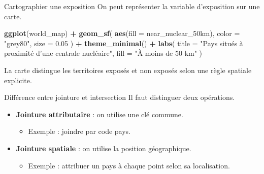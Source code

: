 \documentclass[
  10pt,
  ignorenonframetext,
]{beamer}
\newenvironment{Shaded}{\begin{snugshade}}{\end{snugshade}}
\newcommand{\AttributeTok}[1]{\textcolor[rgb]{0.13,0.29,0.53}{#1}}
\newcommand{\FloatTok}[1]{\textcolor[rgb]{0.00,0.00,0.81}{#1}}
\newcommand{\FunctionTok}[1]{\textcolor[rgb]{0.13,0.29,0.53}{\textbf{#1}}}
\newcommand{\NormalTok}[1]{#1}
\newcommand{\SpecialCharTok}[1]{\textcolor[rgb]{0.81,0.36,0.00}{\textbf{#1}}}
\newcommand{\StringTok}[1]{\textcolor[rgb]{0.31,0.60,0.02}{#1}}
\begin{document}
\begin{frame}[fragile]{Cartographier une exposition}
\label{cartographier-une-exposition}
On peut représenter la variable d'exposition sur une carte.

\begin{Shaded}
\begin{Highlighting}[]
\FunctionTok{ggplot}\NormalTok{(world\_map) }\SpecialCharTok{+}
  \FunctionTok{geom\_sf}\NormalTok{(}
    \FunctionTok{aes}\NormalTok{(}\AttributeTok{fill =}\NormalTok{ near\_nuclear\_50km),}
    \AttributeTok{color =} \StringTok{"grey80"}\NormalTok{,}
    \AttributeTok{size =} \FloatTok{0.05}
\NormalTok{  ) }\SpecialCharTok{+}
  \FunctionTok{theme\_minimal}\NormalTok{() }\SpecialCharTok{+}
  \FunctionTok{labs}\NormalTok{(}
    \AttributeTok{title =} \StringTok{"Pays situés à proximité d’une centrale nucléaire"}\NormalTok{,}
    \AttributeTok{fill =} \StringTok{"À moins de 50 km"}
\NormalTok{  )}
\end{Highlighting}
\end{Shaded}

La carte distingue les territoires exposés et non exposés selon une
règle spatiale explicite.
\end{frame}

\begin{frame}{Différence entre jointure et intersection}
\label{diffuxe9rence-entre-jointure-et-intersection}
Il faut distinguer deux opérations.

\begin{itemize}
  \item \textbf{Jointure attributaire} : on utilise une clé commune.
  \begin{itemize}
    \item Exemple : joindre par code pays.
  \end{itemize}

  \item \textbf{Jointure spatiale} : on utilise la position géographique.
  \begin{itemize}
    \item Exemple : attribuer un pays à chaque point selon sa localisation.
  \end{itemize}
\end{itemize}
\end{frame}
\end{document}
